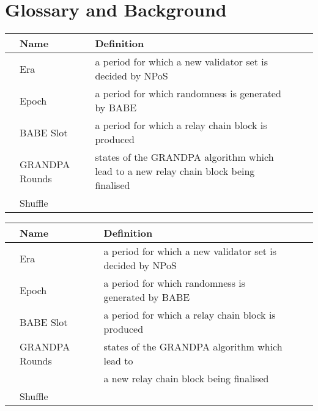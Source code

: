 \section{Glossary and Background}


\begin{table}[h]
\begin{tabular}{lllll}
& \textbf{Name}  & \textbf{Definition} \\
\hline
& Era  & a period for which a new validator set is decided by NPoS \\
& Epoch & a period for which randomness is generated by BABE\\
& BABE Slot & a period for which a relay chain block is produced \\
& GRANDPA Rounds & states of the GRANDPA algorithm which lead to a new relay chain block being finalised  \\
& Shuffle &  \\
\end{tabular}
\end{table}



\begin{table}[h]
\begin{tabular}{lllll}
& \textbf{Name}  & \textbf{Definition} \\
\hline
& Era  & a period for which a new validator set is decided by NPoS 
\\
& Epoch & a period for which randomness is generated by BABE
\\
& BABE Slot & a period for which a relay chain block is produced 
\\
& GRANDPA Rounds & states of the GRANDPA algorithm which lead to 
\\
& & a new relay chain block being finalised  
\\
& Shuffle &  \\
\end{tabular}
\end{table}
